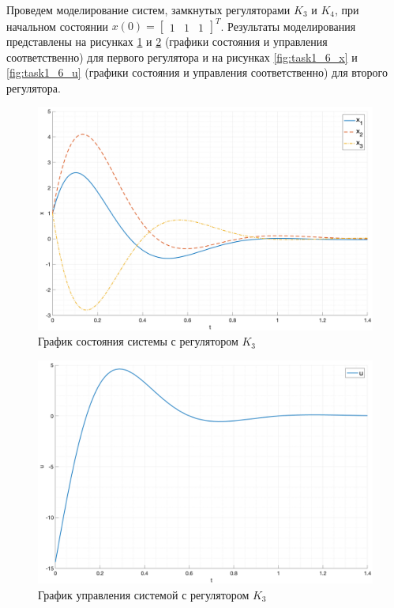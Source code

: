 Проведем моделирование систем, замкнутых регуляторами $K_3$ и $K_4$,
при начальном состоянии $x(0) = \begin{bmatrix}1 & 1 & 1\end{bmatrix}^T$.
Результаты моделирования представлены на рисунках \ref{fig:task1_5_x} и \ref{fig:task1_5_u} 
(графики состояния и управления соответственно) для первого регулятора и на рисунках \ref{fig:task1_6_x} и \ref{fig:task1_6_u} 
(графики состояния и управления соответственно) для второго регулятора.
\begin{figure}[ht!]
    \centering
    \includegraphics[width=\textwidth]{media/plots/task1_5_x.png}
    \caption{График состояния системы с регулятором $K_3$}
    \label{fig:task1_5_x}
\end{figure}
\begin{figure}[ht!]
    \centering
    \includegraphics[width=\textwidth]{media/plots/task1_5_u.png}
    \caption{График управления системой с регулятором $K_3$}
    \label{fig:task1_5_u}
\end{figure}
